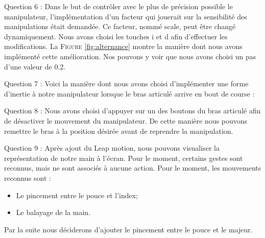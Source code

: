 \documentclass[a4paper,12pt]{article}
\begin{document}
Question 6 : Dans le but de contrôler avec le plus de précision possible le manipulateur, l'implémentation d'un facteur qui jouerait sur la sensibilité des manipulations était demandée. Ce facteur, nommé \og{}scale\fg{}, peut être changé dynamiquement. Nous avons choisi les touches \og{}i\fg{} et \og{}d\fg{} afin d'effectuer les modifications. La \textsc{Figure} \ref{fig:alternance} montre la manière dont nous avons implémenté cette amélioration. Nos pouvons y voir que nous avons choisi un pas d'une valeur de 0.2.

Question 7 : Voici la manière dont nous avons choisi d'implémenter une forme d'inertie à notre manipulateur lorsque le bras articulé arrive en bout de course :

Question 8 : Nous avons choisi d'appuyer sur un des boutons du bras articulé afin de désactiver le mouvement du manipulateur. De cette manière nous pouvons remettre le bras à la position désirée avant de reprendre la manipulation.

Question 9 : Après ajout du Leap motion, nous pouvons visualiser la représentation de notre main à l'écran. Pour le moment, certains gestes sont reconnus, mais ne sont associés à aucune action. Pour le moment, les mouvements reconnus sont :
\begin{itemize}
  \item Le pincement entre le pouce et l'index;
  \item Le balayage de la main.
\end{itemize}

Par la suite nous déciderons d'ajouter le pincement entre le pouce et le majeur.
\end{document}
